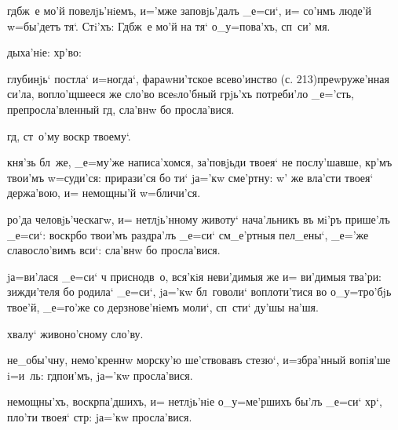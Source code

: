     гд бж~е мо'й 
повелjь'нiемъ, и='мже заповjь'далъ _е=си`, и= со'нмъ 
люде'й w=бы'детъ тя`. Стi'хъ: Гд бж~е мо'й на тя` 
о_у=пова'хъ, сп~си' мя.

 дыха'нiе:        хр'во: 



  глубинjь` постла` и=ногда`, 
фараwни'тское всево'инство (с. 213)преwруже'нная си'ла, 
вопло'щшееся же сло'во всеsло'бный грjь'хъ потреби'ло 
_е='сть, препросла'вленный гд, сла'внw бо просла'вися.

  гд, ст~о'му воскр 
твоему`.

 кня'зь бл~же, _е=му'же написа'хомся, 
за'повjьди твоея` не послу'шавше, кр'мъ твои'мъ 
w=суди'ся: прирази'ся бо ти` jа='кw сме'ртну: w' же 
вла'сти твоея` держа'вою, и= немощны'й w=бличи'ся.

 ро'да человjь'ческагw, и= 
нетлjь'нному животу` нача'льникъ въ мi'ръ прише'лъ 
_е=си`: воскр бо твои'мъ раздра'лъ _е=си` 
см_е'ртныя пел_ены`, _е='же славосло'вимъ вси`: сла'внw 
бо просла'вися.

  jа=ви'лася _е=си` ч 
приснодв~о, вся'кiя неви'димыя же и= ви'димыя тва'ри: 
зижди'теля бо родила` _е=си`, jа='кw бл~говоли` 
воплоти'тися во о_у=тро'бjь твое'й, _е=го'же со 
дерзнове'нiемъ моли`, сп~сти` ду'шы на'шя.

   \kinovarsimple{[_е=гw'же}   хвалу` живоно'сному сло'ву.\kinovarsimple{] 
Гла'съ в~.}


  не_обы'чну, немо'креннw 
морску'ю ше'ствовавъ стезю`, и=збра'нный вопiя'ше i=и~ль: 
гд пои'мъ, jа='кw просла'вися.

 немощны'хъ, воскр па'дшихъ, и= 
нетлjь'нiе о_у=ме'ршихъ бы'лъ _е=си` хр`, пло'ти 
твоея` стр: jа='кw просла'вися.

